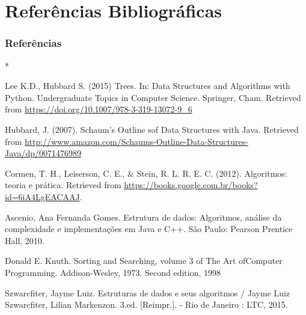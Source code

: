 \documentclass{beamer}
\begin{document}
\section{Referências Bibliográficas}
\begin{frame}[t,allowframebreaks]
\frametitle{Referências}
%
%
\begin{thebibliography}{*}

         Lee K.D., Hubbard S. (2015) Trees. In: Data Structures and Algorithms with Python. Undergraduate Topics in Computer Science. Springer, Cham. Retrieved from \url{https://doi.org/10.1007/978-3-319-13072-9_6}
        
        Hubbard, J. (2007). Schaum’s Outline sof Data Structures with Java. Retrieved from \url{http://www.amazon.com/Schaums-Outline-Data-Structures-Java/dp/0071476989}
        
         Cormen, T. H., Leiserson, C. E., \& Stein, R. L. R. E. C. (2012). Algoritmos: teoria e prática. Retrieved from \url{https://books.google.com.br/books?id=6iA4LgEACAAJ}.
        
         Ascenio, Ana Fernanda Gomes. Estrutura de dados: Algoritmos, análise da complexidade e implementações em Java e C++. São Paulo: Pearson Prentice Hall, 2010.
        
         Donald E. Knuth. Sorting and Searching, volume 3 of The Art ofComputer Programming. Addison-Wesley, 1973. Second edition, 1998
        
         Szwarcfiter, Jayme Luiz. Estruturas de dados e seus algoritmos / Jayme Luiz Szwarcfiter, Lilian Markenzon. 3.ed. [Reimpr.]. - Rio de Janeiro : LTC, 2015.
        
\end{thebibliography}
\end{frame}
\section{}


\begin{frame}
\titlepage
\end{frame}
\end{document}

